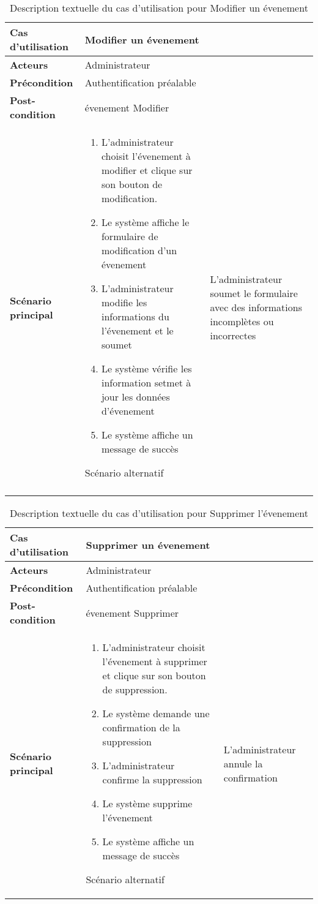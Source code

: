 \begin{longtable}{|>{\bfseries}p{4cm}|p{10cm}|}
\hline
Cas d’utilisation &  Modifier un évenement \\
\hline
Acteurs & Administrateur \\
\hline
Précondition & Authentification préalable\\
\hline
Post-condition & évenement Modifier\\
\hline
Scénario principal & 
\begin{enumerate}
  \item  L’administrateur choisit l'évenement à modifier et clique sur son bouton de modification.

  \item Le système affiche le formulaire de modification d’un évenement

  \item L’administrateur modifie les informations du l'évenement et le soumet
  \item Le système vérifie les information setmet à jour les données d'évenement 
  \item Le système affiche un message de succès
\end{enumerate} 
\hline
Scénario alternatif & L’administrateur soumet le formulaire avec des informations incomplètes ou incorrectes \\
 \hline 
\caption{Description textuelle du cas d’utilisation pour  Modifier un évenement  }
\end{longtable}



\begin{longtable}{|>{\bfseries}p{4cm}|p{10cm}|}
\hline
Cas d’utilisation &  Supprimer un évenement \\
\hline
Acteurs & Administrateur \\
\hline
Précondition & Authentification préalable\\
\hline
Post-condition & évenement Supprimer\\
\hline
Scénario principal & 
\begin{enumerate}
  \item  L’administrateur choisit l'évenement à supprimer et clique sur son bouton de suppression.

  \item Le système demande une confirmation de la suppression

  \item  L’administrateur confirme la suppression
  \item Le système supprime l'évenement 
  \item Le système affiche un message de succès
\end{enumerate} 
\hline

Scénario alternatif & L’administrateur annule la confirmation
 \hline
\caption{Description textuelle du cas d’utilisation pour  Supprimer l'évenement }
\end{longtable}


